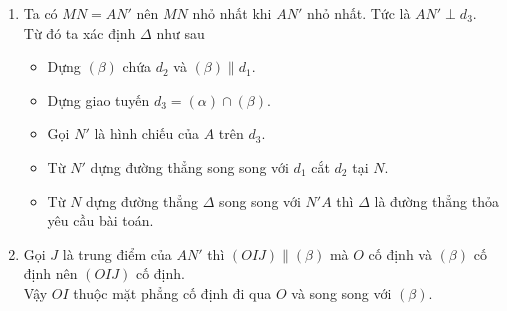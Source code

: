 \begin{bt}
{\begin{enumerate}
\item Ta có $MN=AN'$ nên $MN$ nhỏ nhất khi $AN'$ nhỏ nhất. Tức là  $AN' \perp d_3$.\\
Từ đó ta xác định $\Delta$ như sau
\begin{itemize}
\item Dựng $(\beta)$ chứa $d_2$ và $(\beta) \parallel  d_1$.
\item Dựng giao tuyến $d_3=(\alpha)\cap (\beta)$.
\item Gọi $N'$ là hình chiếu của $A$ trên $d_3$.
\item Từ $N'$ dựng đường thẳng song song với $d_1$ cắt $d_2$ tại $N$.
\item Từ $N$ dựng đường thẳng $\Delta$ song song với $N'A$ thì $\Delta$ là đường thẳng thỏa yêu cầu bài toán.
\end{itemize}
\item Gọi $J$ là trung điểm của $AN'$ thì $(OIJ)\parallel (\beta)$ mà $O$ cố định và $(\beta)$ cố định nên $(OIJ)$ cố định.\\
Vậy $OI$ thuộc mặt phẳng cố định đi qua $O$ và song song với $(\beta)$.
\end{enumerate}

}
\end{bt}

